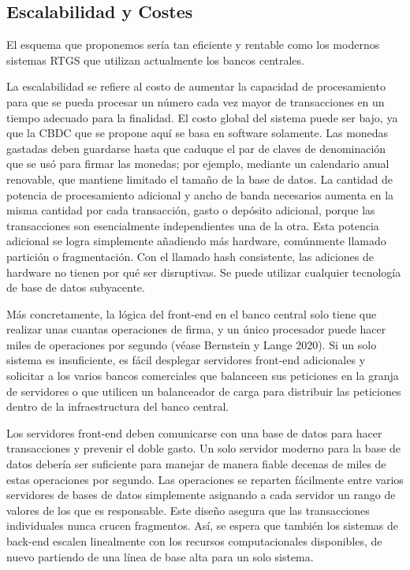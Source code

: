 \documentclass[10pt,spanish]{article}
\begin{document}
\hypertarget{escalabilidad-y-costes}{%
\subsection{Escalabilidad y Costes}\label{escalabilidad-y-costes}}

El esquema que proponemos sería tan eficiente y rentable como los
modernos sistemas RTGS que utilizan actualmente los bancos centrales.

La escalabilidad se refiere al costo de aumentar la capacidad de
procesamiento para que se pueda procesar un número cada vez mayor de
transacciones en un tiempo adecuado para la finalidad. El costo global
del sistema puede ser bajo, ya que la CBDC que se propone aquí se basa
en software solamente. Las monedas gastadas deben guardarse hasta que
caduque el par de claves de denominación que se usó para firmar las
monedas; por ejemplo, mediante un calendario anual renovable, que
mantiene limitado el tamaño de la base de datos. La cantidad de potencia
de procesamiento adicional y ancho de banda necesarios aumenta en la
misma cantidad por cada transacción, gasto o depósito adicional, porque
las transacciones son esencialmente independientes una de la otra. Esta
potencia adicional se logra simplemente añadiendo más hardware,
comúnmente llamado partición o fragmentación. Con el llamado hash
consistente, las adiciones de hardware no tienen por qué ser
disruptivas. Se puede utilizar cualquier tecnología de base de datos
subyacente.

Más concretamente, la lógica del front-end en el banco central solo
tiene que realizar unas cuantas operaciones de firma, y un único
procesador puede hacer miles de operaciones por segundo (véase Bernstein
y Lange 2020). Si un solo sistema es insuficiente, es fácil desplegar
servidores front-end adicionales y solicitar a los varios bancos
comerciales que balanceen sus peticiones en la granja de servidores o
que utilicen un balanceador de carga para distribuir las peticiones
dentro de la infraestructura del banco central.

Los servidores front-end deben comunicarse con una base de datos para
hacer transacciones y prevenir el doble gasto. Un solo servidor moderno
para la base de datos debería ser suficiente para manejar de manera
fiable decenas de miles de estas operaciones por segundo. Las
operaciones se reparten fácilmente entre varios servidores de bases de
datos simplemente asignando a cada servidor un rango de valores de los
que es responsable. Este diseño asegura que las transacciones
individuales nunca crucen fragmentos. Así, se espera que también los
sistemas de back-end escalen linealmente con los recursos
computacionales disponibles, de nuevo partiendo de una línea de base
alta para un solo sistema.
\end{document}
